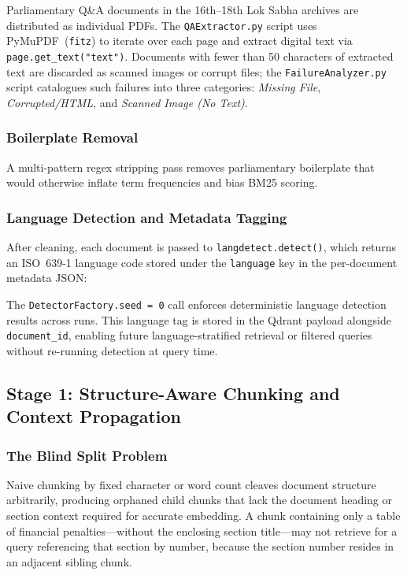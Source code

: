 \documentclass[conference]{IEEEtran}
\begin{document}
Parliamentary Q\&A documents in the 16th--18th Lok Sabha archives are
distributed as individual PDFs.
The \texttt{QAExtractor.py} script uses PyMuPDF~(\texttt{fitz}) to iterate
over each page and extract digital text via \texttt{page.get\_text("text")}.
Documents with fewer than 50 characters of extracted text are discarded as
scanned images or corrupt files; the \texttt{FailureAnalyzer.py} script
catalogues such failures into three categories: \emph{Missing File},
\emph{Corrupted/HTML}, and \emph{Scanned Image (No Text)}.

\subsubsection{Boilerplate Removal}

A multi-pattern regex stripping pass removes parliamentary boilerplate that
would otherwise inflate term frequencies and bias BM25 scoring.

\subsubsection{Language Detection and Metadata Tagging}

After cleaning, each document is passed to \texttt{langdetect.detect()},
which returns an ISO~639-1 language code stored under the \texttt{language}
key in the per-document metadata JSON:


\noindent The \texttt{DetectorFactory.seed = 0} call enforces deterministic
language detection results across runs.
This language tag is stored in the Qdrant payload alongside \texttt{document\_id},
enabling future language-stratified retrieval or filtered queries without
re-running detection at query time.

\subsection{Stage 1: Structure-Aware Chunking and Context Propagation}
\label{sec:chunking}

\subsubsection{The Blind Split Problem}

Naive chunking by fixed character or word count cleaves document structure
arbitrarily, producing orphaned child chunks that lack the document heading
or section context required for accurate embedding.
A chunk containing only a table of financial penalties---without the enclosing
section title---may not retrieve for a query referencing that section by number,
because the section number resides in an adjacent sibling chunk.
\end{document}
